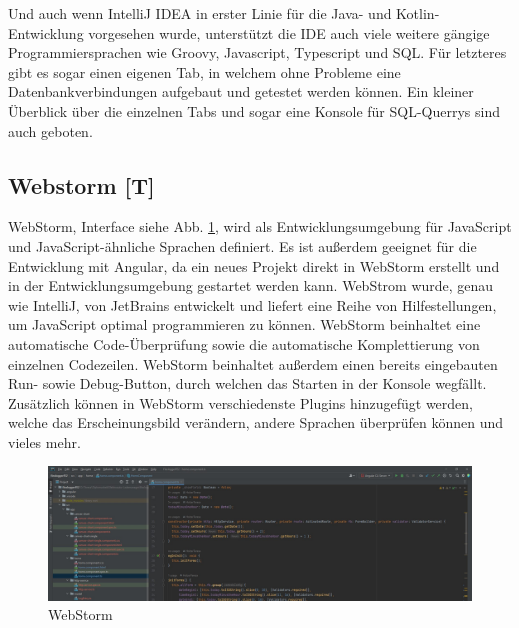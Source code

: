 Und auch wenn IntelliJ IDEA in erster Linie für die Java- und Kotlin-Entwicklung vorgesehen wurde, unterstützt die IDE auch viele weitere gängige Programmiersprachen wie Groovy, Javascript, Typescript und SQL. Für letzteres gibt es sogar einen eigenen Tab, in welchem ohne Probleme eine Datenbankverbindungen aufgebaut und getestet werden können. Ein kleiner Überblick über die einzelnen Tabs und sogar eine Konsole für SQL-Querrys sind auch geboten.


\cite{IntellijJetbrains}





\subsection{Webstorm [T]} 
WebStorm, Interface siehe Abb. \ref{fig:impl:webstorm}, wird als Entwicklungsumgebung für JavaScript und JavaScript-ähnliche Sprachen definiert. Es ist außerdem geeignet für die Entwicklung mit Angular, da ein neues Projekt direkt in WebStorm erstellt und in der Entwicklungsumgebung gestartet werden kann. WebStrom wurde, genau wie IntelliJ, von JetBrains entwickelt und liefert eine Reihe von Hilfestellungen, um JavaScript optimal programmieren zu können. WebStorm beinhaltet eine automatische Code-Überprüfung sowie die automatische Komplettierung von einzelnen Codezeilen. WebStorm beinhaltet außerdem einen bereits eingebauten Run- sowie Debug-Button, durch welchen das Starten in der Konsole wegfällt. Zusätzlich können in WebStorm verschiedenste Plugins hinzugefügt werden, welche das Erscheinungsbild verändern, andere Sprachen überprüfen können und vieles mehr. \cite{webstormOfficialSite}


\begin{figure}[h t]
\centering
\includegraphics[scale=0.38]{pics/webstorm.jpg}
\caption{WebStorm}
\label{fig:impl:webstorm}
\end{figure}



